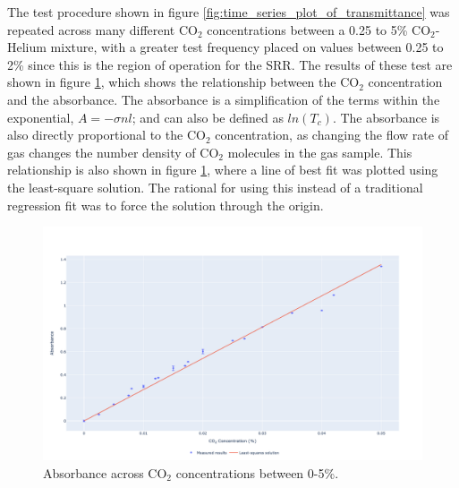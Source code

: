 The test procedure shown in figure \ref{fig:time_series_plot_of_transmittance} was repeated across many different CO$_2$ concentrations between a 0.25 to 5\% CO$_2$-Helium mixture, with a greater test frequency placed on values between 0.25 to 2\% since this is the region of operation for the SRR. The results of these test are shown in figure \ref{fig:co2_conc_absorbance}, which shows the relationship between the CO$_2$ concentration and the absorbance. The absorbance is a simplification of the terms within the exponential, $A = -\sigma n l$; and can also be defined as $ln (T_c)$. The absorbance is also directly proportional to the CO$_2$ concentration, as changing the flow rate of gas changes the number density of CO$_2$ molecules in the gas sample. This relationship is also shown in figure \ref{fig:co2_conc_absorbance}, where a line of best fit was plotted using the least-square solution. The rational for using this instead of a traditional regression fit was to force the solution through the origin.


\begin{figure}[h!]
	\centering
	\includegraphics[width=1\linewidth]{chapter_4/figures/co2_conc_absorbance.png}
	\caption{Absorbance across CO$_2$ concentrations between 0-5\%.}
	\label{fig:co2_conc_absorbance}
\end{figure}







